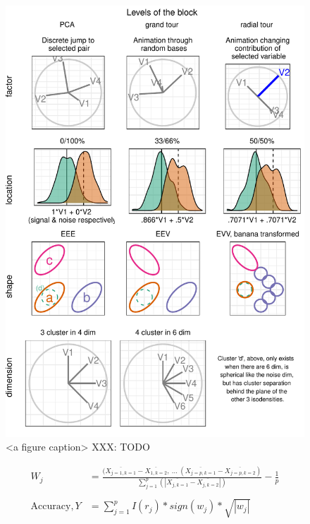 \documentclass{monashthesis}
\begin{document}
\begin{figure}

{\centering \includegraphics[width=1\linewidth,]{./figures_from_script/ch4_fig2_exp_factors} 

}

\caption{<a figure caption> XXX: TODO}\label{fig:ch4fig2}
\end{figure}

\begin{align*}
W_{j} &=\frac
{(\overline{X_{j=1, k=1}} - \overline{X_{1, k=2}}, ~...~
(\overline{X_{j=p, k=1}} - \overline{X_{j=p, k=2}})}
{\sum_{j=1}^{p}(|\overline{X_{j,k=1}} - \overline{X_{j,k=2}}|)}
- \frac{1}{p} \\
\\
\text{Accuracy}, Y &= \sum_{j=1}^{p}I(r_j) * sign(w_j) * \sqrt{|w_j|}  \\
\end{align*}
\end{document}
